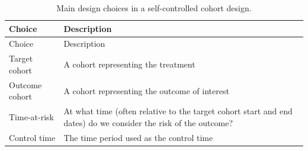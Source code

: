 \documentclass[]{book}
\begin{document}
\begin{longtable}[]{@{}ll@{}}
\caption{\label{tab:sccChoices} Main design choices in a self-controlled
cohort design.}\tabularnewline
\toprule
\begin{minipage}[b]{0.23\columnwidth}\raggedright\strut
Choice\strut
\end{minipage} & \begin{minipage}[b]{0.71\columnwidth}\raggedright\strut
Description\strut
\end{minipage}\tabularnewline
\midrule
\endfirsthead
\toprule
\begin{minipage}[b]{0.23\columnwidth}\raggedright\strut
Choice\strut
\end{minipage} & \begin{minipage}[b]{0.71\columnwidth}\raggedright\strut
Description\strut
\end{minipage}\tabularnewline
\midrule
\endhead
\begin{minipage}[t]{0.23\columnwidth}\raggedright\strut
Target cohort\strut
\end{minipage} & \begin{minipage}[t]{0.71\columnwidth}\raggedright\strut
A cohort representing the treatment\strut
\end{minipage}\tabularnewline
\begin{minipage}[t]{0.23\columnwidth}\raggedright\strut
Outcome cohort\strut
\end{minipage} & \begin{minipage}[t]{0.71\columnwidth}\raggedright\strut
A cohort representing the outcome of interest\strut
\end{minipage}\tabularnewline
\begin{minipage}[t]{0.23\columnwidth}\raggedright\strut
Time-at-risk\strut
\end{minipage} & \begin{minipage}[t]{0.71\columnwidth}\raggedright\strut
At what time (often relative to the target cohort start and end dates)
do we consider the risk of the outcome?\strut
\end{minipage}\tabularnewline
\begin{minipage}[t]{0.23\columnwidth}\raggedright\strut
Control time\strut
\end{minipage} & \begin{minipage}[t]{0.71\columnwidth}\raggedright\strut
The time period used as the control time\strut
\end{minipage}\tabularnewline
\bottomrule
\end{longtable}
\end{document}

